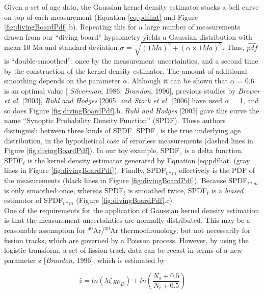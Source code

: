 \documentclass[12pt,twoside]{article}
\begin{document}
Given a set of age  data, the Gaussian kernel density estimator stacks
a bell curve on top  of each measurement (Equation \ref{eq:pdfhat} and
Figure \ref{fig:divingBoardPdf}.b).  Repeating this for a large number
of measurements  drawn from our  ``diving board'' hypsometry  yields a
Gaussian distribution with mean  10 Ma and standard deviation $\sigma$
= $\sqrt{(1  Ma)^2 + (\alpha \times 1  Ma)^2}$.  Thus, $\widehat{pdf}$
is ``double-smoothed'':  once by the measurement  uncertainties, and a
second time by the construction  of the kernel density estimator.  The
amount  of additional  smoothing depends  on the  parameter  $\alpha$. 
Although it  can be shown  that $\alpha$ =  0.6 is an optimal  value [
{\it Silverman}, 1986; {\it  Brandon}, 1996], previous studies by {\it
  Brewer et al.}  [2003], {\it  Ruhl and Hodges} [2005] and {\it Stock
  et  al.}   [2006]  have  used  $\alpha$  = 1,  and  so  does  Figure
\ref{fig:divingBoardPdf}.b.   {\it Ruhl and  Hodges} [2005]  gave this
curve  the  name ``Synoptic  Probability  Density  Function'' (SPDF).  
These authors distinguish between  three kinds of SPDF.  SPDF$_{z}$ is
the  true underlying  age distribution,  in the  hypothetical  case of
errorless      measurements      (dashed      lines     in      Figure
\ref{fig:divingBoardPdf}).  In  our toy  example, SPDF$_z$ is  a delta
function.   SPDF$_{t}$ is  the kernel  density estimator  generated by
Equation      \ref{eq:pdfhat}      (gray      lines     in      Figure
\ref{fig:divingBoardPdf}).   Finally, SPDF$_{t*m}$ effectively  is the
PDF     of    the    measurements     (black    lines     in    Figure
\ref{fig:divingBoardPdf}).   Because  SPDF$_{t*m}$  is  only  smoothed
once,  whereas SPDF$_{t}$  is  smoothed twice,  SPDF$_{t}$  is a  {\it
  biased} estimator of SPDF$_{t*m}$ (Figure
\ref{fig:divingBoardPdf}.c).\\

One of the requirements for the application of Gaussian kernel density
estimation  is   that  the  measurement   uncertainties  are  normally
distributed.     This   may   be    a   reasonable    assumption   for
$^{40}$Ar/$^{39}$Ar thermochronology, but  not necessarily for fission
tracks, which  are governed by  a Poisson process.  However,  by using
the logistic transform,  a set of fission track data  can be recast in
terms of a  new parameter z [{\it Brandon},  1996], which is estimated
by

\begin{equation}
  \label{eq:z}
  \hat{z} = ln(\lambda \zeta \ g \rho_D) + ln(\frac{N_s + 0.5}{N_i + 0.5})
\end{equation}
\end{document}
